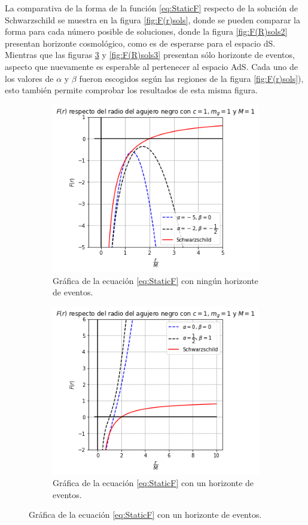    La comparativa de la forma de la función \eqref{eq:StaticF} respecto de la solución de Schwarzschild se muestra en la figura \ref{fig:F(r)sols}, donde se pueden comparar la forma para cada número posible de soluciones, donde la figura \ref{fig:F(R)sols2} presentan horizonte cosmológico, como es de esperarse para el espacio dS. Mientras que las figuras \ref{fig:F(R)sols1} y \ref{fig:F(R)sols3} presentan sólo horizonte de eventos, aspecto que nuevamente es esperable al pertenecer al espacio AdS. Cada uno de los valores de $\alpha$ y $\beta$ fueron escogidos según las regiones de la figura \ref{fig:F(r)sols}), esto también permite comprobar los resultados de esta misma figura.\\
 \begin{figure}[H]
    \centering
    \ContinuedFloat*
     \begin{subfigure}[b]{0.4\textwidth}
         \includegraphics[scale=0.45]{SoluciónEstática/Horizonte de Eventos/F(r) Estática0.png}
         \caption{Gráfica de la ecuación \eqref{eq:StaticF} con ningún horizonte de eventos.}
         \label{fig:F(R)sols0}
     \end{subfigure}
     \hspace{1cm}
     \begin{subfigure}[b]{0.4\textwidth}
         \includegraphics[scale=0.45]{SoluciónEstática/Horizonte de Eventos/F(r) Estática1.png}
         \caption{Gráfica de la ecuación \eqref{eq:StaticF} con un horizonte de eventos.}
         \label{fig:F(R)sols1}
     \end{subfigure} 
\end{figure}
